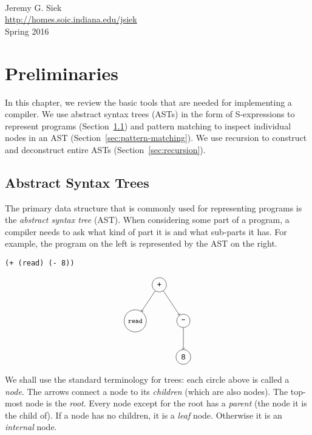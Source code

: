 \documentclass[11pt]{book}
\begin{document}
\mbox{}\\
\noindent Jeremy G. Siek \\
\noindent \url{http://homes.soic.indiana.edu/jsiek} \\
\noindent Spring 2016 

\chapter{Preliminaries}
\label{ch:trees-recur}

In this chapter, we review the basic tools that are needed for
implementing a compiler. We use abstract syntax trees (ASTs) in the
form of S-expressions to represent programs (Section~\ref{sec:ast})
and pattern matching to inspect individual nodes in an AST
(Section~\ref{sec:pattern-matching}).  We use recursion to construct
and deconstruct entire ASTs (Section~\ref{sec:recursion}).

\section{Abstract Syntax Trees}
\label{sec:ast}

The primary data structure that is commonly used for representing
programs is the \emph{abstract syntax tree} (AST). When considering
some part of a program, a compiler needs to ask what kind of part it
is and what sub-parts it has. For example, the program on the left is
represented by the AST on the right.
\begin{center}
\begin{minipage}{0.4\textwidth}
\begin{lstlisting}
(+ (read) (- 8))
\end{lstlisting}
\end{minipage}
\begin{minipage}{0.4\textwidth}
\begin{equation}
\begin{tikzpicture}
 \node[draw, circle] (plus)  at (0 ,  0) {\key{+}};
 \node[draw, circle] (read)  at (-1, -1.5) {{\footnotesize\key{read}}};
 \node[draw, circle] (minus) at (1 , -1.5) {$\key{-}$};
 \node[draw, circle] (8)     at (1 , -3) {\key{8}};

 \draw[->] (plus) to (read);
 \draw[->] (plus) to (minus);
 \draw[->] (minus) to (8);
\end{tikzpicture}
\label{eq:arith-prog}
\end{equation}
\end{minipage}
\end{center}
We shall use the standard terminology for trees: each circle above is
called a \emph{node}. The arrows connect a node to its \emph{children}
(which are also nodes). The top-most node is the \emph{root}.  Every
node except for the root has a \emph{parent} (the node it is the child
of). If a node has no children, it is a \emph{leaf} node.  Otherwise
it is an \emph{internal} node.
\end{document}
